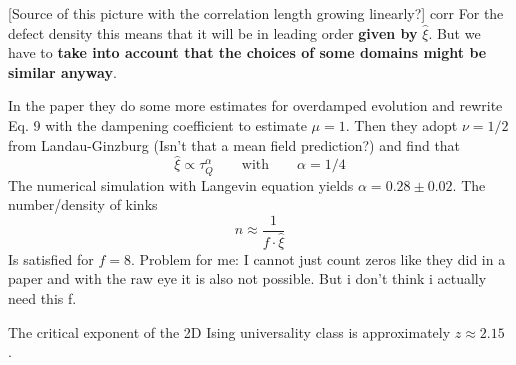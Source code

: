	[Source of this picture with the correlation length growing linearly?]
	corr
	For the defect density this means that it will be in leading order \textbf{given by }$\hat{\xi}$. But we have to \textbf{take into account that the choices of some domains might be similar anyway}.
	
	In the paper they do some more estimates for overdamped evolution and rewrite Eq. 9 with the dampening coefficient to estimate $\mu = 1$. Then they adopt $\nu =	1/2$ from Landau-Ginzburg (Isn't that a mean field prediction?) and find that
	\begin{equation}
		\hat{\xi} \propto \tau_Q^{\alpha} \qquad \text{with} \qquad \alpha = 1/4
	\end{equation}
	The numerical simulation with Langevin equation yields $\alpha = 0.28 \pm 0.02$. The number/density of kinks
	\begin{equation}
		n  \approx \frac{1}{f \cdot \hat{\xi}}
	\end{equation}
	Is satisfied for $f=8$. Problem for me: I cannot just count zeros like they did in a paper and with the raw eye it is also not possible. But i don't think i actually need this f.
	
	The critical exponent of the 2D Ising universality class is approximately $z \approx 2.15$ \cite{adzhemyan2022dynamic} \cite{dammann1993dynamical}.
	
